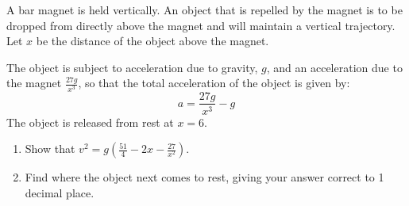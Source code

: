 
\begin{problem}
A bar magnet is held vertically. An object that is repelled by the magnet is to be dropped from directly above the magnet and will maintain a vertical trajectory. Let $x$ be the distance of the object above the magnet.

\begin{center}
\end{center}

The object is subject to acceleration due to gravity, $g$, and an acceleration due to the magnet $\frac{27g}{x^3}$, so that the total acceleration of the object is given by:
\[
    a = \frac{27g}{x^3} - g
\]
The object is released from rest at $x = 6$.

\begin{enumerate}
    \item[(i)] Show that $v^2 = g\left(\frac{51}{4} - 2x - \frac{27}{x^2}\right)$.
    \item[(ii)] Find where the object next comes to rest, giving your answer correct to 1 decimal place.
\end{enumerate}
\end{problem}

